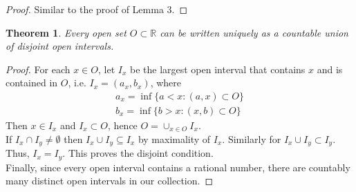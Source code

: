 \documentclass[a4paper, 11pt]{book}
\newtheorem{theorem}{Theorem}
\theoremstyle{definition}
\theoremstyle{remark}
\begin{document}
    \begin{proof}
        Similar to the proof of Lemma 3.
    \end{proof}

    \begin{theorem}
        Every open set $O\subset\mathbb{R}$ can be written uniquely as a countable union of disjoint open intervals.
    \end{theorem}
    \begin{proof}
        For each $x\in O$, let $I_x$ be the largest open interval that contains $x$ and is contained in $O$, i.e. $I_x=(a_x,b_x)$,
        where 
        \begin{align*}
            a_x = \inf\{a<x: (a,x)\subset O\}\\
            b_x = \inf\{b>x: (x,b)\subset O\}
        \end{align*}
        Then $x\in I_x$ and $I_x\subset O$, hence $O = \cup_{x\in O} I_x$.\\
        If $I_x\cap I_y\neq\emptyset$ then $I_x\cup I_y\subseteq I_x$ by maximality of $I_x$. Similarly for $I_x\cup I_y\subset I_y$.
        Thus, $I_x = I_y$. This proves the disjoint condition.\\
        Finally, since every open interval contains a rational number, there are countably many distinct open intervals in our collection.
    \end{proof}
\end{document}
